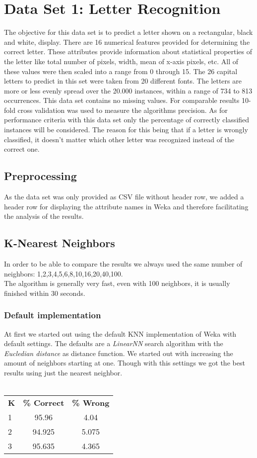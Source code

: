 \documentclass{article}
\begin{document}
\section{Data Set 1: Letter Recognition}
The objective for this data set is to predict a letter shown on a rectangular, black and white, display. There are 16 numerical features  provided for determining the correct letter. These attributes provide information about statistical properties of the letter like total number of pixels, width, mean of x-axis pixels, etc.
All of these values were then scaled into a range from 0 through 15. The 26 capital letters to predict in this set were taken from 20 different fonts. The letters are more or less evenly spread over the 20.000 instances, within a range of 734 to 813 occurrences. This data set contains no missing values. For comparable results 10-fold cross validation was used to measure the algorithms precision.
As for performance criteria with this data set only the percentage of correctly classified instances will be considered. The reason for this being that if a letter is wrongly classified, it doesn't matter which other letter was recognized instead of the correct one. 
\\
\subsection{Preprocessing}
As the data set was only provided as CSV file without header row, we added a header row for displaying the attribute names in Weka and therefore facilitating the analysis of the results. 
\\
\subsection{K-Nearest Neighbors}
In order to be able to compare the results we always used the same number of neighbors: 1,2,3,4,5,6,8,10,16,20,40,100.\\
The algorithm is generally very fast, even with 100 neighbors, it is usually finished within 30 seconds. 
\subsubsection{Default implementation}
At first we started out using the default KNN implementation of Weka with default settings. The defaults are a \emph{LinearNN} search algorithm with the \emph{Eucledian distance} as distance function. We started out with increasing the amount of neighbors starting at one. Though with this settings we got the best results using just the nearest neighbor. 
\\\\
\begin{tabular}{ l | c |c }
\textbf{K} & \textbf{\% Correct} & \textbf{\% Wrong} \\
1 & 95.96 & 4.04 \\
2 & 94.925 & 5.075 \\
3 & 95.635 & 4.365 \\
\end{tabular}
\end{document}
